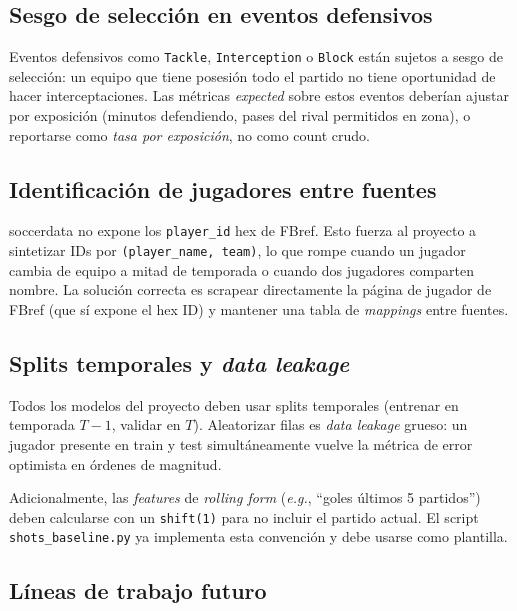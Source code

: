 \subsection{Sesgo de selección en eventos defensivos}

Eventos defensivos como \texttt{Tackle}, \texttt{Interception} o \texttt{Block} están sujetos a sesgo de selección: un equipo que tiene posesión todo el partido no tiene oportunidad de hacer interceptaciones. Las métricas \emph{expected} sobre estos eventos deberían ajustar por exposición (minutos defendiendo, pases del rival permitidos en zona), o reportarse como \emph{tasa por exposición}, no como count crudo.

\subsection{Identificación de jugadores entre fuentes}

soccerdata no expone los \texttt{player\_id} hex de FBref. Esto fuerza al proyecto a sintetizar IDs por \texttt{(player\_name, team)}, lo que rompe cuando un jugador cambia de equipo a mitad de temporada o cuando dos jugadores comparten nombre. La solución correcta es scrapear directamente la página de jugador de FBref (que sí expone el hex ID) y mantener una tabla de \emph{mappings} entre fuentes.

\subsection{Splits temporales y \emph{data leakage}}

Todos los modelos del proyecto deben usar splits temporales (entrenar en temporada $T-1$, validar en $T$). Aleatorizar filas es \emph{data leakage} grueso: un jugador presente en train y test simultáneamente vuelve la métrica de error optimista en órdenes de magnitud.

Adicionalmente, las \emph{features} de \emph{rolling form} (\emph{e.g.}, ``goles últimos 5 partidos'') deben calcularse con un \texttt{shift(1)} para no incluir el partido actual. El script \texttt{shots\_baseline.py} ya implementa esta convención y debe usarse como plantilla.

\subsection{Líneas de trabajo futuro}


